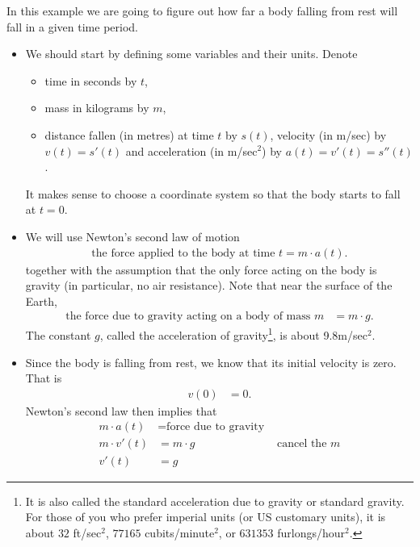 \begin{eg}\label{eg:fallingBallB}
In this example we are going to figure out how far a body falling from rest will fall in
a given time period.
\begin{itemize}
 \item We should start by defining some variables and their units. Denote
  \begin{itemize}
   \item time in seconds by $t$,
   \item mass in kilograms by $m$,
  \item distance fallen (in metres) at time $t$ by $s(t)$, velocity (in m/sec) by
  $v(t)=s'(t)$ and acceleration (in m/sec$^2$) by $a(t)=v'(t)=s''(t)$.
  \end{itemize}
It makes sense to choose a coordinate system so that the body starts to fall at $t=0$.

\item We will use Newton's second law of motion
\begin{align*}
\text{the force applied to the body at time $t$} = m \cdot a(t).
\end{align*}
together with the assumption that the only force acting on the body is gravity (in
particular, no air resistance). Note that near the surface of the Earth,
\begin{align*}
\text{the force due to gravity acting on a body of mass $m$} &= m \cdot g.
\end{align*}
The constant $g$, called the acceleration of gravity\footnote{It is also called the
standard acceleration due to gravity or standard gravity. For those of you who prefer
imperial units (or US customary units), it is about $32$ ft/sec$^2$, $77165$
cubits/minute$^2$, or $631353$ furlongs/hour$^2$.}, is about 9.8m/sec$^2$.

\item Since the body is falling from rest, we know that its initial velocity is zero.
That is
\begin{align*}
  v(0) &= 0.
\end{align*}
Newton's second law then implies that
\begin{align*}
m\cdot a(t) &= \text{force due to gravity} \\
  m \cdot v'(t) &= m \cdot g & \text{ cancel the $m$} \\
  v'(t) &=g
\end{align*}


\end{itemize}
\end{eg}
